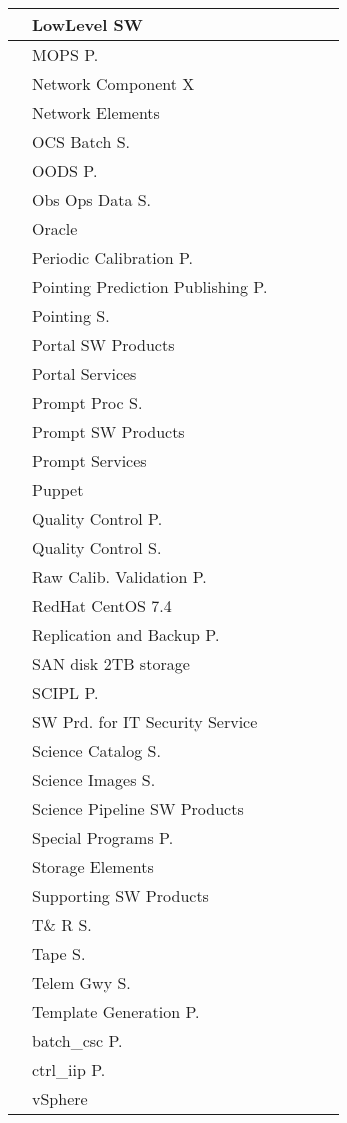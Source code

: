 \begin{longtable}{|p{}|p{}|p{}|p{}|p{}|p{}|}
 &  LowLevel SW &  &  &  & \\ \hline
 &  MOPS P. &  &  &  & \\ \hline
 &  Network Component X &  &  &  & \\ \hline
 &  Network Elements &  &  &  & \\ \hline
 &  OCS Batch S. &  &  &  & \\ \hline
 &  OODS P. &  &  &  & \\ \hline
 &  Obs Ops Data S. &  &  &  & \\ \hline
 &  Oracle &  &  &  & \\ \hline
 &  Periodic Calibration P. &  &  &  & \\ \hline
 &  Pointing Prediction Publishing P. &  &  &  & \\ \hline
 &  Pointing S. &  &  &  & \\ \hline
 &  Portal SW Products &  &  &  & \\ \hline
 &  Portal Services &  &  &  & \\ \hline
 &  Prompt Proc S. &  &  &  & \\ \hline
 &  Prompt SW Products &  &  &  & \\ \hline
 &  Prompt Services &  &  &  & \\ \hline
 &  Puppet &  &  &  & \\ \hline
 &  Quality Control P. &  &  &  & \\ \hline
 &  Quality Control S. &  &  &  & \\ \hline
 &  Raw Calib. Validation P. &  &  &  & \\ \hline
 &  RedHat CentOS 7.4 &  &  &  & \\ \hline
 &  Replication and Backup P. &  &  &  & \\ \hline
 &  SAN disk 2TB storage &  &  &  & \\ \hline
 &  SCIPL P. &  &  &  & \\ \hline
 &  SW Prd. for IT Security Service &  &  &  & \\ \hline
 &  Science Catalog S. &  &  &  & \\ \hline
 &  Science Images S. &  &  &  & \\ \hline
 &  Science Pipeline SW Products &  &  &  & \\ \hline
 &  Special Programs P. &  &  &  & \\ \hline
 &  Storage Elements &  &  &  & \\ \hline
 &  Supporting SW Products &  &  &  & \\ \hline
 &  T\& R S. &  &  &  & \\ \hline
 &  Tape S. &  &  &  & \\ \hline
 &  Telem Gwy S. &  &  &  & \\ \hline
 &  Template Generation P. &  &  &  & \\ \hline
 &  batch\_csc P. &  &  &  & \\ \hline
 &  ctrl\_iip P. &  &  &  & \\ \hline
 &  vSphere &  &  &  & \\ \hline
\end{longtable}
\normalsize
